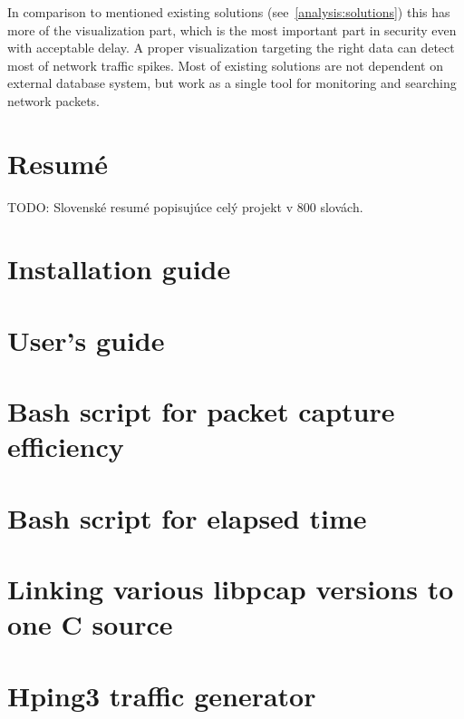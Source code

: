 \documentclass[12pt,a4paper,twoside]{report}
\begin{document}
	In comparison to mentioned existing solutions (see~\autoref{analysis:solutions}) this has more of the visualization part, which is the most important part in security even with acceptable delay. A proper visualization targeting the right data can detect most of network traffic spikes.
Most of existing solutions are not dependent on external database system, but work as a single tool for monitoring and searching network packets.
\chapter{Resumé}
	TODO: Slovenské resumé popisujúce celý projekt v 800 slovách.
\newpage



\begin{appendices}
	\chapter{Installation guide} \label{appendix:install}
		
	\chapter{User's guide} \label{appendix:userguide}
		
	\chapter{Bash script for packet capture efficiency} \label{appendix:script:droprate}
		
	\chapter{Bash script for elapsed time} \label{appendix:script:timed}
		
	\chapter{Linking various libpcap versions to one C source} \label{appendix:compilation:pcaps}
		
	\chapter{Hping3 traffic generator} \label{appendix:hping3}
		

\end{appendices}
\end{document}
